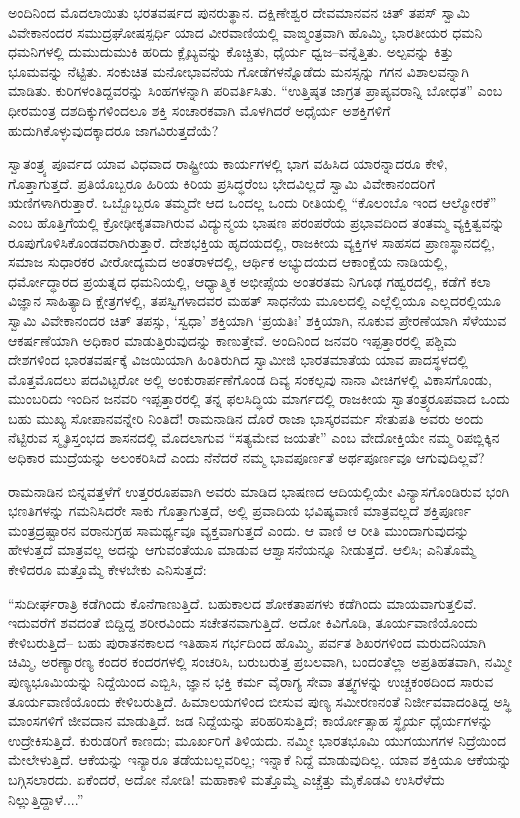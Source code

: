 ಅಂದಿನಿಂದ ಮೊದಲಾಯಿತು ಭರತವರ್ಷದ ಪುನರುತ್ಥಾನ. ದಕ್ಷಿಣೇಶ್ವರ ದೇವಮಾನವನ ಚಿತ್​ ತಪಸ್​ ಸ್ವಾಮಿ ವಿವೇಕಾನಂದರ ಸಮುದ್ರಘೋಷಸ್ಪರ್ಧಿ ಯಾದ ವೀರವಾಣಿಯಲ್ಲಿ ವಾಙ್ಮಂತ್ರವಾಗಿ ಹೊಮ್ಮಿ, ಭಾರತೀಯರ ಧಮನಿ ಧಮನಿಗಳಲ್ಲಿ ದುಮುದುಮುಕಿ ಹರಿದು ಕ್ಲೈಬ್ಯವನ್ನು ಕೊಚ್ಚಿತು, ಧೈರ್ಯ ಧ್ವಜ–ವನ್ನೆತ್ತಿತು. ಅಲ್ಪವನ್ನು ಕಿತ್ತು ಭೂಮವನ್ನು ನೆಟ್ಟಿತು. ಸಂಕುಚಿತ ಮನೋಭಾವನೆಯ ಗೋಡೆಗಳನ್ನೊಡೆದು ಮನಸ್ಸನ್ನು ಗಗನ ವಿಶಾಲವನ್ನಾಗಿ ಮಾಡಿತು. ಕುರಿಗಳಂತಿದ್ದವರನ್ನು ಸಿಂಹಗಳನ್ನಾಗಿ ಪರಿವರ್ತಿಸಿತು. “ಉತ್ತಿಷ್ಠತ ಜಾಗ್ರತ ಪ್ರಾಪ್ಯವರಾನ್ನಿ ಬೋಧತ” ಎಂಬ ಧೀರಮಂತ್ರ ದಶದಿಕ್ಕುಗಳಿಂದಲೂ ಶಕ್ತಿ ಸಂಚಾರಕವಾಗಿ ಮೊಳಗಿದರೆ ಅಧೈರ್ಯ ಅಶಕ್ತಿಗಳಿಗೆ ಹುದುಗಿಕೊಳ್ಳುವುದಕ್ಕಾದರೂ ಜಾಗವಿರುತ್ತದೆಯೆ?

ಸ್ವಾತಂತ್ರ್ಯ ಪೂರ್ವದ ಯಾವ ವಿಧವಾದ ರಾಷ್ಟ್ರೀಯ ಕಾರ್ಯಗಳಲ್ಲಿ ಭಾಗ ವಹಿಸಿದ ಯಾರನ್ನಾದರೂ ಕೇಳಿ, ಗೊತ್ತಾಗುತ್ತದೆ. ಪ್ರತಿಯೊಬ್ಬರೂ ಹಿರಿಯ ಕಿರಿಯ ಪ್ರಸಿದ್ಧರೆಂಬ ಭೇದವಿಲ್ಲದೆ ಸ್ವಾಮಿ ವಿವೇಕಾನಂದರಿಗೆ ಋಣಿಗಳಾಗಿರುತ್ತಾರೆ. ಒಬ್ಬೊಬ್ಬರೂ ತಮ್ಮದೇ ಆದ ಒಂದಲ್ಲ ಒಂದು ರೀತಿಯಲ್ಲಿ “ಕೊಲಂಬೊ ಇಂದ ಆಲ್ಮೋರಕೆ” ಎಂಬ ಹೊತ್ತಿಗೆಯಲ್ಲಿ ಕ್ರೋಢೀಕೃತವಾಗಿರುವ ವಿದ್ಯುನ್ಮಯ ಭಾಷಣ ಪರಂಪರೆಯ ಪ್ರಭಾವದಿಂದ ತಂತಮ್ಮ ವ್ಯಕ್ತಿತ್ವವನ್ನು ರೂಪುಗೊಳಿಸಿಕೊಂಡವರಾಗಿರುತ್ತಾರೆ. ದೇಶಭಕ್ತಿಯ ಹೃದಯದಲ್ಲಿ, ರಾಜಕೀಯ ವ್ಯಕ್ತಿಗಳ ಸಾಹಸದ ಪ್ರಾಣಸ್ಥಾನದಲ್ಲಿ, ಸಮಾಜ ಸುಧಾರಕರ ವೀರೋದ್ಯಮದ ಅಂತರಾಳದಲ್ಲಿ, ಆರ್ಥಿಕ ಅಭ್ಯುದಯದ ಆಕಾಂಕ್ಷೆಯ ನಾಡಿಯಲ್ಲಿ, ಧರ್ಮೋದ್ಧಾರದ ಪ್ರಯತ್ನದ ಧಮನಿಯಲ್ಲಿ, ಆಧ್ಯಾತ್ಮಿಕ ಅಭೀಪ್ಸೆಯ ಅಂತರತಮ ನಿಗೂಢ ಗಹ್ವರದಲ್ಲಿ, ಕಡೆಗೆ ಕಲಾ ವಿಜ್ಞಾನ ಸಾಹಿತ್ಯಾದಿ ಕ್ಷೇತ್ರಗಳಲ್ಲಿ, ತಪಸ್ವಿಗಳಾದವರ ಮಹತ್​ ಸಾಧನೆಯ ಮೂಲದಲ್ಲಿ ಎಲ್ಲೆಲ್ಲಿಯೂ ಎಲ್ಲದರಲ್ಲಿಯೂ ಸ್ವಾಮಿ ವಿವೇಕಾನಂದರ ಚಿತ್​ ತಪಸ್ಸು, ‘ಸ್ವಧಾ’ ಶಕ್ತಿಯಾಗಿ ‘ಪ್ರಯತಿಃ’ ಶಕ್ತಿಯಾಗಿ, ನೂಕುವ ಪ್ರೇರಣೆಯಾಗಿ ಸೆಳೆಯುವ ಆಕರ್ಷಣೆಯಾಗಿ ಅಧಿಕಾರ ಮಾಡುತ್ತಿರುವುದನ್ನು ಕಾಣುತ್ತೇವೆ. ಅಂದಿನಿಂದ ಜನವರಿ ಇಪ್ಪತ್ತಾರರಲ್ಲಿ ಪಶ್ಚಿಮ ದೇಶಗಳಿಂದ ಭಾರತವರ್ಷಕ್ಕೆ ವಿಜಯಿಯಾಗಿ ಹಿಂತಿರುಗಿದ ಸ್ವಾಮೀಜಿ ಭಾರತಮಾತೆಯ ಯಾವ ಪಾದಸ್ಥಳದಲ್ಲಿ ಮೊತ್ತಮೊದಲು ಪದವಿಟ್ಟರೋ ಅಲ್ಲಿ ಅಂಕುರಾರ್ಪಣೆಗೊಂಡ ದಿವ್ಯ ಸಂಕಲ್ಪವು ನಾನಾ ವೀಚಿಗಳಲ್ಲಿ ವಿಕಾಸಗೊಂಡು, ಮುಂಬರಿದು ಇಂದಿನ ಜನವರಿ ಇಪ್ಪತ್ತಾರರಲ್ಲಿ ತನ್ನ ಫಲಸಿದ್ಧಿಯ ಮಾರ್ಗದಲ್ಲಿ ರಾಜಕೀಯ ಸ್ವಾತಂತ್ರ್ಯರೂಪವಾದ ಒಂದು ಬಹು ಮುಖ್ಯ ಸೋಪಾನವನ್ನೇರಿ ನಿಂತಿದೆ! ರಾಮನಾಡಿನ ದೊರೆ ರಾಜಾ ಭಾಸ್ಕರವರ್ಮ ಸೇತುಪತಿ ಅವರು ಅಂದು ನೆಟ್ಟಿರುವ ಸ್ಮೃತಿಸ್ತಂಭದ ಶಾಸನದಲ್ಲಿ ಮೊದಲಾಗುವ “ಸತ್ಯಮೇವ ಜಯತೇ” ಎಂಬ ವೇದೋಕ್ತಿಯೇ ನಮ್ಮ ರಿಪಬ್ಲಿಕ್ಕಿನ ಅಧಿಕಾರ ಮುದ್ರೆಯನ್ನು ಅಲಂಕರಿಸಿದೆ ಎಂದು ನೆನೆದರೆ ನಮ್ಮ ಭಾವಪೂರ್ಣತೆ ಅರ್ಥಪೂರ್ಣವೂ ಆಗುವುದಿಲ್ಲವೆ?

ರಾಮನಾಡಿನ ಬಿನ್ನವತ್ತಳೆಗೆ ಉತ್ತರರೂಪವಾಗಿ ಅವರು ಮಾಡಿದ ಭಾಷಣದ ಆದಿಯಲ್ಲಿಯೇ ವಿನ್ಯಾಸಗೊಂಡಿರುವ ಭಂಗಿ ಭಣತಿಗಳನ್ನು ಗಮನಿಸಿದರೇ ಸಾಕು ಗೊತ್ತಾಗುತ್ತದೆ, ಅಲ್ಲಿ ಪ್ರವಾದಿಯ ಭವಿಷ್ಯವಾಣಿ ಮಾತ್ರವಲ್ಲದೆ ಶಕ್ತಿಪೂರ್ಣ ಮಂತ್ರದ್ರಷ್ಟಾರನ ವರಾನುಗ್ರಹ ಸಾಮರ್ಥ್ಯವೂ ವ್ಯಕ್ತವಾಗುತ್ತದೆ ಎಂದು. ಆ ವಾಣಿ ಆ ರೀತಿ ಮುಂದಾಗುವುದನ್ನು ಹೇಳುತ್ತದೆ ಮಾತ್ರವಲ್ಲ ಅದನ್ನು ಆಗುವಂತೆಯೂ ಮಾಡುವ ಆಶ್ವಾಸನೆಯನ್ನೂ ನೀಡುತ್ತದೆ. ಆಲಿಸಿ; ಎನಿತೊಮ್ಮೆ ಕೇಳಿದರೂ ಮತ್ತೊಮ್ಮೆ ಕೇಳಬೇಕು ಎನಿಸುತ್ತದೆ:

“ಸುದೀರ್ಘರಾತ್ರಿ ಕಡೆಗಿಂದು ಕೊನೆಗಾಣುತ್ತಿದೆ. ಬಹುಕಾಲದ ಶೋಕತಾಪಗಳು ಕಡೆಗಿಂದು ಮಾಯವಾಗುತ್ತಲಿವೆ. ಇದುವರೆಗೆ ಶವದಂತೆ ಬಿದ್ದಿದ್ದ ಶರೀರವಿಂದು ಸಚೇತನವಾಗುತ್ತಿದೆ. ಅದೋ ಕಿವಿಗೊಡಿ, ತೂರ್ಯವಾಣಿಯೊಂದು ಕೇಳಿಬರುತ್ತಿದೆ– ಬಹು ಪುರಾತನಕಾಲದ ಇತಿಹಾಸ ಗರ್ಭದಿಂದ ಹೊಮ್ಮಿ, ಪರ್ವತ ಶಿಖರಗಳಿಂದ ಮರುದನಿಯಾಗಿ ಚಿಮ್ಮಿ, ಅರಣ್ಯಾರಣ್ಯ ಕಂದರ ಕಂದರಗಳಲ್ಲಿ ಸಂಚರಿಸಿ, ಬರುಬರುತ್ತ ಪ್ರಬಲವಾಗಿ, ಬಂದಂತೆಲ್ಲಾ ಅಪ್ರತಿಹತವಾಗಿ, ನಮ್ಮೀ ಪುಣ್ಯಭೂಮಿಯನ್ನು ನಿದ್ದೆಯಿಂದ ಎಬ್ಬಿಸಿ, ಜ್ಞಾನ ಭಕ್ತಿ ಕರ್ಮ ವೈರಾಗ್ಯ ಸೇವಾ ತತ್ತ್ವಗಳನ್ನು ಉಚ್ಚಕಂಠದಿಂದ ಸಾರುವ ತೂರ್ಯವಾಣಿಯೊಂದು ಕೇಳಿಬರುತ್ತಿದೆ. ಹಿಮಾಲಯಗಳಿಂದ ಬೀಸುವ ಪುಣ್ಯ ಸಮೀರಣನಂತೆ ನಿರ್ಜೀವವಾದಂತಿದ್ದ ಅಸ್ಥಿ ಮಾಂಸಗಳಿಗೆ ಜೀವದಾನ ಮಾಡುತ್ತಿದೆ. ಜಡ ನಿದ್ದೆಯನ್ನು ಪರಿಹರಿಸುತ್ತಿದೆ; ಕಾರ್ಯೋತ್ಸಾಹ ಸ್ಥೈರ್ಯ ಧೈರ್ಯಗಳನ್ನು ಉದ್ರೇಕಿಸುತ್ತಿದೆ. ಕುರುಡರಿಗೆ ಕಾಣದು; ಮೂರ್ಖರಿಗೆ ತಿಳಿಯದು. ನಮ್ಮೀ ಭಾರತಭೂಮಿ ಯುಗಯುಗಗಳ ನಿದ್ರೆಯಿಂದ ಮೇಲೇಳುತ್ತಿದೆ. ಆಕೆಯನ್ನು ಇನ್ಯಾರೂ ತಡೆಯಬಲ್ಲವರಿಲ್ಲ; ಇನ್ನಾಕೆ ನಿದ್ದೆ ಮಾಡುವುದಿಲ್ಲ. ಯಾವ ಶಕ್ತಿಯೂ ಆಕೆಯನ್ನು ಬಗ್ಗಿಸಲಾರದು. ಏಕೆಂದರೆ, ಅದೋ ನೋಡಿ! ಮಹಾಕಾಳಿ ಮತ್ತೊಮ್ಮೆ ಎಚ್ಚೆತ್ತು ಮೈಕೊಡವಿ ಉಸಿರೆಳೆದು ನಿಲ್ಲುತ್ತಿದ್ದಾಳೆ....”

